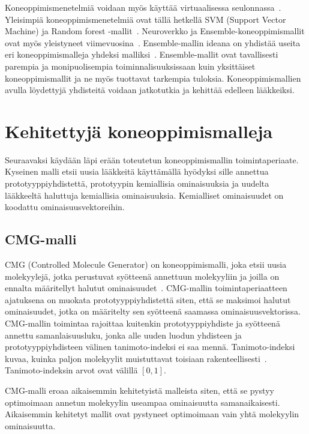 \documentclass[finnish,twoside,censored,tkt,sw-line]{HYthesisML}
\begin{document}
Koneoppimismenetelmiä voidaan myös käyttää virtuaalisessa seulonnassa~\cite{SotrifferChristoph2011VSPC}.
Yleisimpiä koneoppimismenetelmiä ovat tällä hetkellä SVM (Support Vector Machine) ja Random forest -mallit~\cite{SotrifferChristoph2011VSPC}.
Neuroverkko ja Ensemble-koneoppimismallit ovat myös yleistyneet viimevuosina~\cite{ShinBonggun,PopovaMariya2018Drlf}.
Ensemble-mallin ideana on yhdistää useita eri koneoppimismalleja yhdeksi malliksi~\cite{RokachLior2009Ec}.
Ensemble-mallit ovat tavallisesti parempia ja monipuolisempia toiminnalisuuksissaan kuin yksittäiset koneoppimismallit ja ne myös tuottavat tarkempia tuloksia.
Koneoppimismallien avulla löydettyjä yhdisteitä voidaan jatkotutkia ja kehittää edelleen lääkkeiksi.

\section{Kehitettyjä koneoppimismalleja}

Seuraavaksi käydään läpi erään toteutetun koneoppimismallin toimintaperiaate.
Kyseinen malli etsii uusia lääkkeitä käyttämällä hyödyksi sille annettua prototyyppiyhdistettä, prototyypin kemiallisia ominaisuuksia ja uudelta lääkkeeltä haluttuja kemiallisia ominaisuuksia.
Kemialliset ominaisuudet on koodattu ominaisuusvektoreihin.

\subsection{CMG-malli}

CMG (Controlled Molecule Generator) on koneoppimismalli, joka etsii uusia molekyylejä, jotka perustuvat syötteenä annettuun molekyyliin ja joilla on ennalta määritellyt halutut ominaisuudet~\cite{ShinBonggun}.
CMG-mallin toimintaperiaatteen ajatuksena on muokata prototyyppiyhdistettä siten, että se maksimoi halutut ominaisuudet, jotka on määritelty sen syötteenä saamassa ominaisuusvektorissa.
CMG-mallin toimintaa rajoittaa kuitenkin prototyyppiyhdiste ja syötteenä annettu samanlaisuusluku, jonka alle uuden luodun yhdisteen ja prototyyppiyhdisteen välinen tanimoto-indeksi ei saa mennä.
Tanimoto-indeksi kuvaa, kuinka paljon molekyylit muistuttavat toisiaan rakenteellisesti~\cite{MaggioraGerald2014Msim}.
Tanimoto-indeksin arvot ovat välillä \([0,1]\).

CMG-malli eroaa aikaisemmin kehitetyistä malleista siten, että se pystyy optimoimaan annetun molekyylin useampaa ominaisuutta samanaikaisesti.
Aikaisemmin kehitetyt mallit ovat pystyneet optimoimaan vain yhtä molekyylin ominaisuutta.
\end{document}

